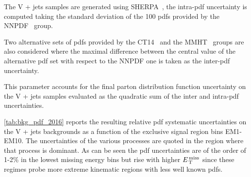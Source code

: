 The V + jets samples are generated using SHERPA~\cite{SHERPAGenerator}, the
intra-\gls{pdf} uncertainty is computed taking the standard deviation of the 100
\glspl{pdf} provided by the NNPDF~\cite{NNPDF} group.

Two alternative sets of \glspl{pdf} provided by the CT14~\cite{CT14PDF} and the
MMHT~\cite{MMHT} groups are also considered where the maximal difference between
the central value of the alternative \gls{pdf} set with respect to the NNPDF one
is taken as the inter-\gls{pdf} uncertainty.
\begin{description}[font=\normalfont]
\item[PDFComb:] This parameter accounts for the final parton distribution
  function uncertainty on the V + jets samples evaluated as the quadratic sum of
  the inter and intra-\gls{pdf} uncertainties.
\end{description}
\cref{tab:bkg_pdf_2016} reports the resulting relative \gls{pdf} systematic
uncertainties on the V + jets backgrounds as a function of the exclusive signal
region bins EM1-EM10. The uncertainties of the various processes are quoted in
the region where that process is dominant. As can be seen the \gls{pdf}
uncertainties are of the order of 1-2\% in the lowest missing energy bins but
rise with higher $E_\mathrm{\, T}^\mathrm{\, miss}$ since these regimes probe more extreme kinematic regions
with less well known \glspl{pdf}.

